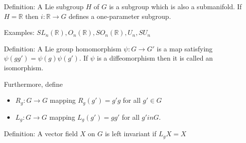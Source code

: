 \documentclass[12pt]{article} %
\begin{document}
Definition: A Lie subgroup $H$ of $G$ is a subgroup which is also a submanifold. If $H = \mathbb{R}$ then $i : \mathbb{R} \rightarrow G$ defines a one-parameter subgroup. 

Examples: $SL_n(\mathbb{R}), O_n(\mathbb{R}), SO_n(\mathbb{R}), U_n, SU_n$

Definition: A Lie group homomorphism $\psi : G \rightarrow G'$ is a map satisfying $\psi(gg') = \psi(g) \psi(g')$. If $\psi$ is a diffeomorphism then it is called an isomorphism. 

Furthermore, define
\begin{itemize}
\item $R_g : G \rightarrow G$ mapping $R_g (g') = g' g$ for all $g' \in G$
\item $L_g : G \rightarrow G$ mapping $L_g (g') = g g'$ for all $g' in G$.
\end{itemize}

Definition: A vector field $X$ on $G$ is left invariant if $L_g X = X$ 






\begin{comment}
\begin{figure}
\centering
\texttt{[image: 3a.pdf]}
\caption{Half the diagrams for photon-photon scattering.}
\label{fig:3a}
\end{figure}
\end{comment}
\end{document}
